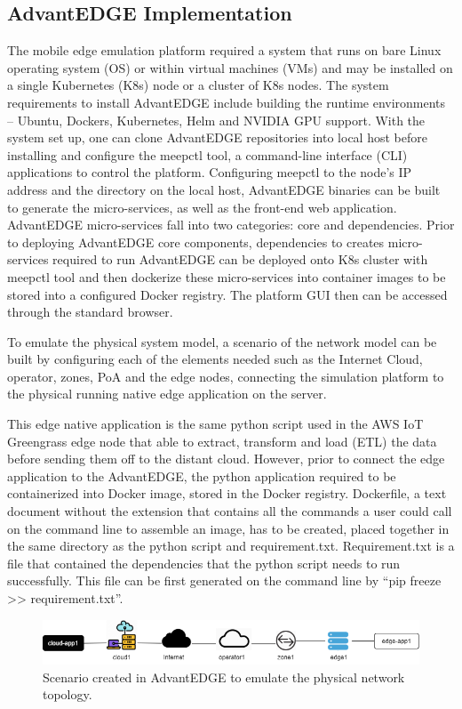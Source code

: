 \subsection{AdvantEDGE Implementation}
The mobile edge emulation platform required a system that runs on bare Linux operating system (OS) or within virtual machines (VMs) and may be installed on a single Kubernetes (K8s) node or a cluster of K8s nodes. The system requirements to install AdvantEDGE include building the runtime environments – Ubuntu, Dockers, Kubernetes, Helm and NVIDIA GPU support. With the system set up, one can clone AdvantEDGE repositories into local host before installing and configure the meepctl tool, a command-line interface (CLI) applications to control the platform. 
Configuring meepctl to the node’s IP address and the directory on the local host, AdvantEDGE binaries can be built to generate the micro-services, as well as the front-end web application. AdvantEDGE micro-services fall into two categories: core and dependencies. Prior to deploying AdvantEDGE core components, dependencies to creates micro-services required to run AdvantEDGE can be deployed onto K8s cluster with meepctl tool and then dockerize these micro-services into container images to be stored into a configured Docker registry. The platform GUI then can be accessed through the standard browser.

To emulate the physical system model, a scenario of the network model can be built by configuring each of the elements needed such as the Internet Cloud, operator, zones, PoA and the edge nodes,  connecting the simulation platform to the physical running native edge application on the server. 

This edge native application is the same python script used in the AWS IoT Greengrass edge node that able to extract, transform and load (ETL) the data before sending them off to the distant cloud. However, prior to connect the edge application to the AdvantEDGE, the python application required to be containerized into Docker image, stored in the Docker registry. Dockerfile, a text document without the extension that contains all the commands a user could call on the command line to assemble an image, has to be created, placed together in the same directory as the python script and requirement.txt. Requirement.txt is a file that contained the dependencies that the python script needs to run successfully. This file can be first generated on the command line by “pip freeze >> requirement.txt”. 

\begin{figure}[ht]
    \centering
    \includegraphics[width=1\linewidth]{pages/Chapter4/Chapter 4 Images/Scenario.png}
    \caption{Scenario created in AdvantEDGE to emulate the physical network topology.}
    \label{fig:AdvantEDGE_scenario}
\end{figure}

